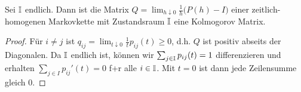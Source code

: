 \documentclass[a4paper]{paper}
\numberwithin{equation}{satz}
\begin{document}
\begin{prop}
Sei $\mathbb{I}$ endlich. Dann ist die Matrix $Q=\lim_{h\downarrow 0}\frac{1}{h}\big(P(h)-I\big)$ einer zeitlich-homogenen Markovkette mit Zustandsraum $\mathbb{I}$  eine Kolmogorov Matrix.
\end{prop}

\begin{proof}
Für $i\neq j$ ist $q_{ij}=\lim_{t\downarrow 0}\frac{1}{t}p_{ij}(t)\geq0$, d.h. $Q$ ist positiv abseits der Diagonalen. Da $\mathbb{I}$ endlich ist, können wir  $\sum_{j\in \mathbb{I}}p_{ij}(t)=1$ differenzieren und erhalten $\sum_{j\in I}p_{ij}'(t)=0$ f+r alle $i\in \mathbb{I}$. Mit $t=0$ ist dann jede Zeilensumme gleich $0$. 
\end{proof}


\begin{comment}
\begin{satz}
  Sei $(X_t)_{t\geq0}$ ein rechtsseitig stetiger Prozess auf $\I$. Dann ist die Wahrscheinlichkeit jedes Zustandes gegeben durch die endlichdimensionalen Verteilungen, also $\P(X_{t_0}=i_0,\dots,X_{t_n}=i_n)$ 
\end{satz}
\end{comment}
\end{document}
